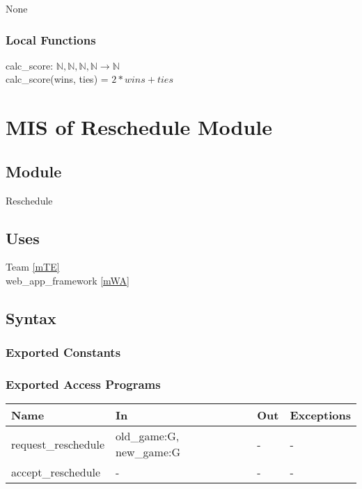 \documentclass[12pt, titlepage]{article}
\begin{document}
None

\subsubsection{Local Functions}

calc\_score: $\mathbb{N}, \mathbb{N}, \mathbb{N}, \mathbb{N} \rightarrow \mathbb{N}$\\
calc\_score(wins, ties) = $2*wins + ties$

\newpage

\section{MIS of Reschedule Module} \label{mRE}

\subsection{Module}

Reschedule

\subsection{Uses}

Team \ref{mTE} \\
web\_app\_framework \ref{mWA}

\subsection{Syntax}

\subsubsection{Exported Constants}

\subsubsection{Exported Access Programs}

\begin{center}
\begin{tabular}{p{5cm} p{4cm} p{4cm} p{2cm}}
\hline
\textbf{Name} & \textbf{In} & \textbf{Out} & \textbf{Exceptions} \\
\hline
request\_reschedule & old\_game:G, new\_game:G & - & - \\
accept\_reschedule & - & - & - \\
\hline
\end{tabular}
\end{center}
\end{document}
